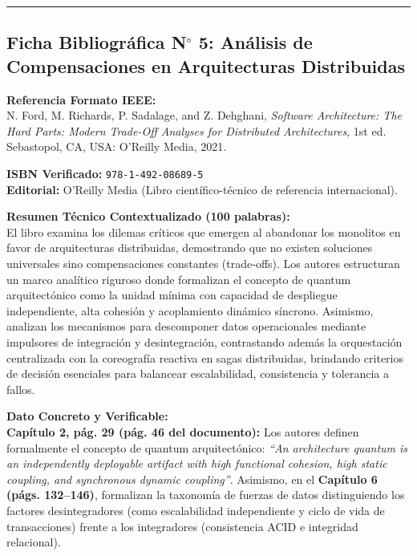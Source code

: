 \documentclass[11pt,a4paper]{article}
\begin{document}
\vspace{4mm}
\hrule
\vspace{5mm}

\subsection*{Ficha Bibliográfica N$^\circ$ 5: Análisis de Compensaciones en Arquitecturas Distribuidas}

\noindent\textbf{Referencia Formato IEEE:}\\
\nocite{Ford2021}\cite{Ford2021} N. Ford, M. Richards, P. Sadalage, and Z. Dehghani, \textit{Software Architecture: The Hard Parts: Modern Trade-Off Analyses for Distributed Architectures}, 1st ed. Sebastopol, CA, USA: O'Reilly Media, 2021.

\vspace{1.5mm}
\noindent\textbf{ISBN Verificado:} \texttt{978-1-492-08689-5}\\
\textbf{Editorial:} O'Reilly Media (Libro científico-técnico de referencia internacional).

\vspace{2mm}
\noindent\textbf{Resumen Técnico Contextualizado (100 palabras):}\\
El libro examina los dilemas críticos que emergen al abandonar los monolitos en favor de arquitecturas distribuidas, demostrando que no existen soluciones universales sino compensaciones constantes (trade-offs). Los autores estructuran un marco analítico riguroso donde formalizan el concepto de quantum arquitectónico como la unidad mínima con capacidad de despliegue independiente, alta cohesión y acoplamiento dinámico síncrono. Asimismo, analizan los mecanismos para descomponer datos operacionales mediante impulsores de integración y desintegración, contrastando además la orquestación centralizada con la coreografía reactiva en sagas distribuidas, brindando criterios de decisión esenciales para balancear escalabilidad, consistencia y tolerancia a fallos.

\vspace{2mm}
\noindent\textbf{Dato Concreto y Verificable:}\\
\textbf{Capítulo 2, pág. 29 (pág. 46 del documento):} Los autores definen formalmente el concepto de quantum arquitectónico: \textit{``An architecture quantum is an independently deployable artifact with high functional cohesion, high static coupling, and synchronous dynamic coupling''}. Asimismo, en el \textbf{Capítulo 6 (págs. 132--146)}, formalizan la taxonomía de fuerzas de datos distinguiendo los factores desintegradores (como escalabilidad independiente y ciclo de vida de transacciones) frente a los integradores (consistencia ACID e integridad relacional).
\end{document}
